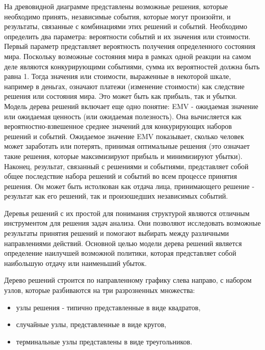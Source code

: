 На древовидной диаграмме представлены возможные решения, которые необходимо принять, независимые события, которые могут произойти, и результаты, связанные с комбинациями этих решений и событий. Необходимо определить два параметра: вероятности событий и их значения или стоимости. Первый параметр представляет вероятность получения определенного состояния мира. Поскольку возможные состояния мира в рамках одной реакции на самом деле являются конкурирующими событиями, сумма их вероятностей должна быть равна 1. 
Тогда значения или стоимости, выраженные в некоторой шкале, например в деньгах, означают платежи (изменение стоимости) как следствие решения или состояния мира. 
Это может быть как прибыль, так и убытки. Модель дерева решений включает еще одно понятие: EMV - ожидаемая значение или ожидаемая ценность (или ожидаемая полезность). Она вычисляется как вероятностно-взвешенное среднее значений для конкурирующих наборов решений и событий. Ожидаемое значение EMV показывает, сколько человек может заработать или потерять, принимая оптимальные решения (это означает такие решения, которые максимизируют прибыль и минимизируют убытки). Наконец, результат, связанный с решениями и событиями, представляет собой общее последствие набора решений и событий во всем процессе принятия решения. Он может быть истолкован как отдача лица, принимающего решение - результат как его решений, так и произошедших независимых событий.

Деревья решений с их простой для понимания структурой являются отличным инструментом для решения задач анализа. Они позволяют исследовать возможные результаты принятия решений и помогают выбирать между различными направлениями действий. Основной целью модели дерева решений является определение наилучшей возможной политики, которая представляет собой наибольшую отдачу или наименьший убыток.


Дерево решений строится по направленному графику слева направо, с набором узлов, которые разбиваются на три разрозненных множества:
\begin{itemize}
    \item узлы решения - типично представленные в виде квадратов,
    \item случайные узлы, представленные в виде кругов,
    \item терминальные узлы представлены в виде треугольников.
\end{itemize}

